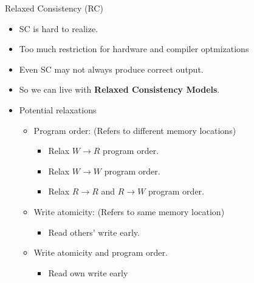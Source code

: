 \documentclass[9pt]{beamer}
\begin{document}
\begin{frame}{Relaxed Consistency (RC)}
\begin{itemize}
\item SC is hard to realize.
\item Too much restriction for hardware and compiler optmizations
\item Even SC may not always produce correct output.
\item So we can live with \textbf{Relaxed Consistency Models}.
\pause
\item Potential relaxations~\cite{rajeev-utah}
  \begin{itemize}
  \item Program order: (Refers to different memory locations)
    \begin{itemize}
    \item Relax $W \rightarrow R$ program order.
    \item Relax $W \rightarrow W$ program order.
    \item Relax $R \rightarrow R$ and $R \rightarrow W$ program order.
    \end{itemize}
\pause
  \item Write atomicity: (Refers to same memory location)
    \begin{itemize}
    \item Read others' write early.
    \end{itemize}
\pause
  \item Write atomicity and program order.
    \begin{itemize}
    \item Read own write early
    \end{itemize}
  \end{itemize}
\end{itemize}
\end{frame}
\end{document}
